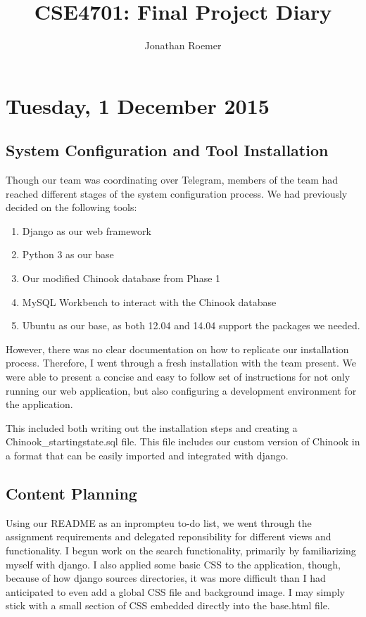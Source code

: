 \documentclass[a4paper,12pt]{article}
\begin{document}
\title{CSE4701: Final Project Diary}
\date{}
\author{Jonathan Roemer}
\maketitle

\section{Tuesday, 1 December 2015}
\subsection{System Configuration and Tool Installation}
Though our team was coordinating over Telegram, members of the team had reached
different stages of the system configuration process. We had previously decided
on the following tools:
\begin{enumerate}
	\item Django as our web framework
	\item Python 3 as our base
	\item Our modified Chinook database from Phase 1
	\item MySQL Workbench to interact with the Chinook database
	\item Ubuntu as our base, as both 12.04 and 14.04 support the packages we 
		needed.
\end{enumerate}

However, there was no clear documentation on how to replicate our installation
process. Therefore, I went through a fresh installation with the team present.
We were able to present a concise and easy to follow set of instructions for
not only running our web application, but also configuring a development
environment for the application.

This included both writing out the installation steps and creating a
Chinook_startingstate.sql file. This file includes our custom version of Chinook
in a format that can be easily imported and integrated with django.

\subsection{Content Planning}
Using our README as an inprompteu to-do list, we went through the assignment
requirements and delegated reponsibility for different views and functionality.
I begun work on the search functionality, primarily by familiarizing myself with
django. I also applied some basic CSS to the application, though, because of how
django sources directories, it was more difficult than I had anticipated to even
add a global CSS file and background image. I may simply stick with a small
section of CSS embedded directly into the base.html file.
\end{document}
